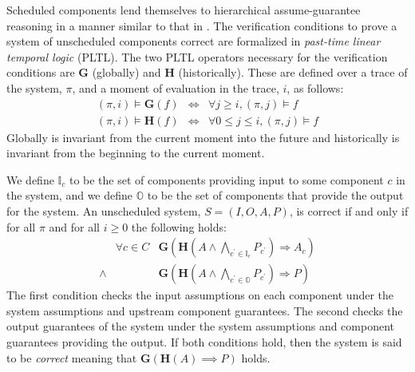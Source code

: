 
\newcommand{\globally}{\ensuremath{\mathbf{G}}}
\newcommand{\historically}{\ensuremath{\mathbf{H}}}
\newcommand{\assumes}{\ensuremath{A}}
\newcommand{\guarantees}{\ensuremath{P}}
\newcommand{\dispatch}{\ensuremath{\mathit{dispatch}}}
\newcommand{\complete}{\ensuremath{\mathit{complete}}}
\newcommand{\same}[1]{\ensuremath{\mathit{same}(#1)}}
\newcommand{\inputs}{\ensuremath{I}}
\newcommand{\outputs}{\ensuremath{O}}
\newcommand{\system}{\ensuremath{S}}
\newcommand{\components}{\ensuremath{C}}
\newcommand{\schedule}{\ensuremath{\phi}}
\newcommand{\valid}{\ensuremath{\mathit{valid}}}
\newcommand{\dpred}{\ensuremath{\delta^\phi}}
\newcommand{\dispred}{\ensuremath{\mathbb{D}^\phi}}
\newcommand{\compred}{\ensuremath{\mathbb{C}^\phi}}

Scheduled components lend themselves to hierarchical assume-guarantee reasoning in a manner similar to that in \cite{AGREE2}.
The verification conditions to prove a system of unscheduled components correct are formalized in \emph{past-time linear temporal logic} (PLTL). 
The two PLTL operators necessary for the verification conditions are $\globally$ (globally) and $\historically$ (historically).
These are defined over a trace of the system, $\pi$, and a moment of evaluation in the trace, $i$, as follows:
\begin{eqnarray*}
 (\pi, i) \models \globally(f) & \iff & \forall j \ge i, (\pi, j) \models f \\
(\pi, i) \models \historically(f) & \iff & \forall 0 \le j \le i, (\pi, j) \models f
\end{eqnarray*}
Globally is invariant from the current moment into the future and historically is invariant from the beginning to the current moment.

We define $\mathbb{I}_c$ to be the set of components providing input to some component $c$ in the system, and we define $\mathbb{O}$ to be the set of components that provide the output for the system. An unscheduled system, $\system = (\inputs, \outputs, \assumes, \guarantees)$, is correct if and only if for all $\pi$ and for all $i \ge 0$ the following holds:
\[
\begin{array}{lll}
        & \forall c \in \components &  
            \globally(\historically(\assumes \wedge 
            \bigwedge_{c^\prime \in \mathbb{I}_c} P_{c^\prime}) 
            \Rightarrow \assumes_c) \\
 \wedge &   & 
            \globally(\historically(\assumes \wedge 
            \bigwedge_{c^\prime \in \mathbb{O}} \guarantees_{c^\prime}) 
            \Rightarrow \guarantees)
\end{array}
\]
The first condition checks the input assumptions on each component under the system assumptions and upstream component guarantees. The second checks the output guarantees of the system under the system assumptions and component guarantees providing the output.  If both conditions hold, then the system is said to be \emph{correct} meaning that $\globally(\historically(\assumes) \implies \guarantees)$ holds.

